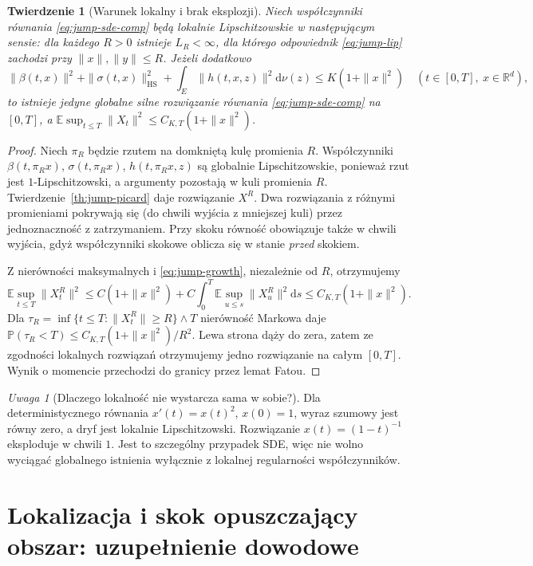 \documentclass[11pt,a4paper,oneside]{report}
\numberwithin{equation}{chapter}
\theoremstyle{plain}
\newtheorem{twierdzenie}{Twierdzenie}[chapter]
\theoremstyle{definition}
\theoremstyle{remark}
\newtheorem{uwaga}{Uwaga}[chapter]
\newcommand{\R}{\mathbb{R}}
\newcommand{\Prob}{\mathbb{P}}
\newcommand{\E}{\mathbb{E}}
\newcommand{\dd}{\mathrm{d}}
\begin{document}
\begin{twierdzenie}[Warunek lokalny i brak eksplozji]
\label{th:jump-local-explosion}
Niech współczynniki równania \eqref{eq:jump-sde-comp}
będą lokalnie Lipschitzowskie w następującym sensie:
dla każdego $R>0$ istnieje $L_R<\infty$, dla którego
odpowiednik \eqref{eq:jump-lip} zachodzi przy
$\|x\|,\|y\|\le R$. Jeżeli dodatkowo
\[
 \|\beta(t,x)\|^2+\|\sigma(t,x)\|_{\mathrm{HS}}^2
 +\int_E\|h(t,x,z)\|^2\dd\nu(z)
 \le K(1+\|x\|^2)
 \quad(t\in[0,T],\ x\in\R^d),
 \tag{13.8}\label{eq:jump-growth}
\]
to istnieje jedyne globalne silne rozwiązanie równania
\eqref{eq:jump-sde-comp} na $[0,T]$, a
$\E\sup_{t\le T}\|X_t\|^2\le C_{K,T}(1+\|x\|^2)$.
\end{twierdzenie}
\begin{proof}
Niech $\pi_R$ będzie rzutem na domkniętą kulę promienia
$R$. Współczynniki $\beta(t,\pi_Rx)$,
$\sigma(t,\pi_Rx)$, $h(t,\pi_Rx,z)$ są globalnie
Lipschitzowskie, ponieważ rzut jest $1$-Lipschitzowski,
a argumenty pozostają w kuli promienia $R$.
Twierdzenie~\ref{th:jump-picard} daje rozwiązanie $X^R$.
Dwa rozwiązania z różnymi promieniami pokrywają się
(do chwili wyjścia z mniejszej kuli) przez jednoznaczność
z zatrzymaniem. Przy skoku równość obowiązuje także
w chwili wyjścia, gdyż współczynniki skokowe oblicza się
w stanie \emph{przed} skokiem.

Z nierówności maksymalnych i \eqref{eq:jump-growth},
niezależnie od $R$, otrzymujemy
\[
 \E\sup_{t\le T}\|X^R_t\|^2
 \le C(1+\|x\|^2)+C\int_0^T
 \E\sup_{u\le s}\|X^R_u\|^2\dd s
 \le C_{K,T}(1+\|x\|^2).
\]
Dla $\tau_R=\inf\{t\le T:\|X^R_t\|\ge R\}\wedge T$
nierówność Markowa daje
$\Prob(\tau_R<T)\le C_{K,T}(1+\|x\|^2)/R^2$.
Lewa strona dąży do zera, zatem ze zgodności lokalnych
rozwiązań otrzymujemy jedno rozwiązanie na całym $[0,T]$.
Wynik o momencie przechodzi do granicy przez lemat Fatou.
\end{proof}

\begin{uwaga}[Dlaczego lokalność nie wystarcza sama w sobie?]
Dla deterministycznego równania $x'(t)=x(t)^2$, $x(0)=1$,
wyraz szumowy jest równy zero, a dryf jest lokalnie
Lipschitzowski. Rozwiązanie $x(t)=(1-t)^{-1}$ eksploduje
w chwili $1$. Jest to szczególny przypadek SDE, więc
nie wolno wyciągać globalnego istnienia wyłącznie z
lokalnej regularności współczynników.
\end{uwaga}


\section{Lokalizacja i skok opuszczający obszar: uzupełnienie dowodowe}
\end{document}

